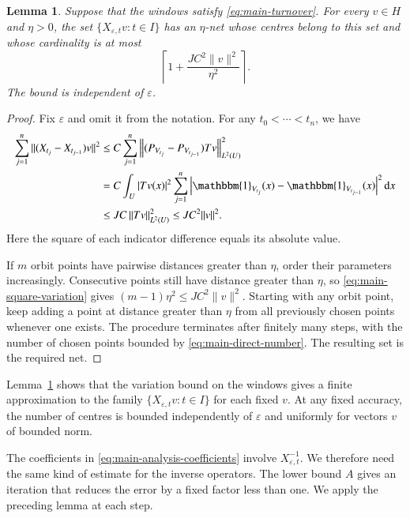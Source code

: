 \documentclass[10pt,a4paper]{amsart}
\newtheorem{lemma}{Lemma}[section]
\def\d{\mathrm{d}}
\newcommand\norm[1]{\|#1\|}
\newcommand\1{\mathbbm{1}}
\newcommand\Norm[2]{\left\|#1\right\|_{#2}}
\newcommand{\eps}{\varepsilon}
\def\d{\mathrm{d}}
\begin{document}
\begin{lemma}\label{lem:main-direct-cover}
Suppose that the windows satisfy \eqref{eq:main-turnover}. For every $v\in H$
and $\eta>0$, the set $\{X_{\eps,t}v:t\in I\}$ has an $\eta$-net whose
centres belong to this set and whose cardinality is at most
\begin{equation}\label{eq:main-direct-number}
    \left\lceil1+\frac{JC^2\norm{v}^2}{\eta^2}\right\rceil.
\end{equation}
The bound is independent of $\eps$.
\end{lemma}
\begin{proof}
Fix $\eps$ and omit it from the notation. For any $t_0<\cdots<t_n$, we have
\begin{equation}\label{eq:main-square-variation}
    \begin{aligned}
    \sum_{j=1}^{n}\norm{(X_{t_j}-X_{t_{j-1}})v}^2
    &\le C\sum_{j=1}^{n}
       \Norm{(P_{V_{t_j}}-P_{V_{t_{j-1}}})Tv}{L^2(U)}^2\\
    &=C\int_U|Tv(x)|^2\sum_{j=1}^{n}
       \left|\1_{V_{t_j}}(x)-\1_{V_{t_{j-1}}}(x)\right|^2\d x\\
    &\le JC\Norm{Tv}{L^2(U)}^2
     \le JC^2\norm{v}^2.
    \end{aligned}
\end{equation}
Here the square of each indicator difference equals its absolute value.

If $m$ orbit points have pairwise distances greater than $\eta$, order their
parameters increasingly. Consecutive points still have distance greater than
$\eta$, so \eqref{eq:main-square-variation} gives
$(m-1)\eta^2\le JC^2\norm{v}^2$.
Starting with any orbit point, keep adding a point at distance greater than
$\eta$ from all previously chosen points whenever one exists.
The procedure terminates after finitely many steps, with the number of chosen
points bounded by \eqref{eq:main-direct-number}. The resulting set is the required net.
\end{proof}

Lemma~\ref{lem:main-direct-cover} shows that the variation bound on the windows
gives a finite approximation to the family $\{X_{\eps,t}v:t\in I\}$ for each
fixed $v$. At any fixed accuracy, the number of centres is bounded independently
of $\eps$ and uniformly for vectors $v$ of bounded norm.

The coefficients in \eqref{eq:main-analysis-coefficients} involve $X_{\eps,t}^{-1}$.
We therefore need the same kind of estimate for the inverse operators.
The lower bound $A$ gives an iteration that reduces the error by a fixed
factor less than one. We apply the preceding lemma at each step.
\end{document}
